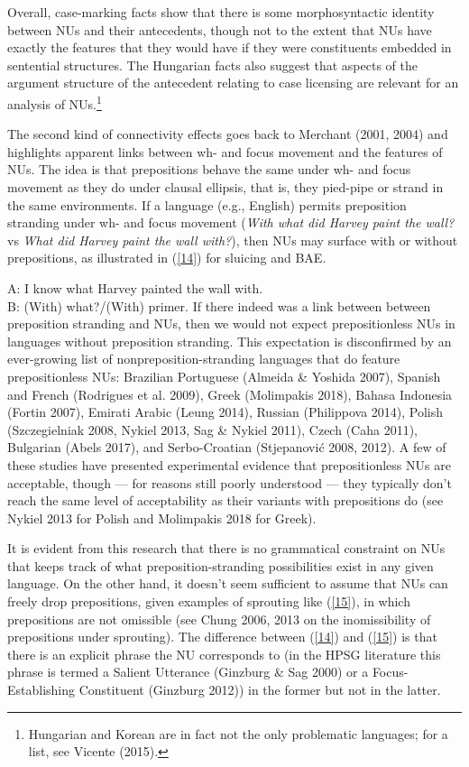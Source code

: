 \documentclass[output=paper]{langsci/langscibook}
\begin{document}
{Overall, case-marking facts show that there is some morphosyntactic identity between NUs and their antecedents, though not to the extent that NUs have exactly the features that they would have if they were constituents embedded in sentential structures. The Hungarian facts also suggest that aspects of the argument structure of the antecedent relating to case licensing are relevant for an analysis of NUs.\footnote{Hungarian and Korean are in fact not the only problematic languages; for a list, see Vicente (2015).}

The second kind of connectivity effects goes back to Merchant (2001, 2004) and highlights apparent links between wh- and focus movement and the features of NUs. The idea is that prepositions behave the same under wh- and focus movement as they do under clausal ellipsis, that is, they pied-pipe or strand in the same environments. If a language (e.g., English) permits preposition stranding under wh- and focus movement ({\it With what did Harvey paint the wall?} vs {\it What did Harvey paint the wall with?}), then NUs may surface with or without prepositions, as illustrated in (\ref{14}) for sluicing and BAE.

\ea A: I know what Harvey painted the wall with.\\B: (With) what?/(With) primer.\label{14}\z
If there indeed was a link between between preposition stranding and NUs, then we would not expect prepositionless NUs in languages without preposition stranding. This expectation is disconfirmed by an ever-growing list of nonpreposition-stranding languages that do feature prepositionless NUs: Brazilian Portuguese (Almeida \& Yoshida 2007), Spanish and French (Rodrigues et al. 2009), Greek (Molimpakis 2018), Bahasa Indonesia (Fortin 2007), Emirati Arabic (Leung 2014), Russian (Philippova 2014), Polish (Szczegielniak 2008, Nykiel 2013, Sag \& Nykiel 2011), Czech (Caha 2011), Bulgarian (Abels 2017), and Serbo-Croatian (Stjepanovi\'{c} 2008, 2012). A few of these studies have presented experimental evidence that prepositionless NUs are acceptable, though --- for reasons still poorly understood --- they typically don't reach the same level of acceptability as their variants with prepositions do (see Nykiel 2013 for Polish and Molimpakis 2018 for Greek).

 It is evident from this research that there is no grammatical constraint on NUs that keeps track of what preposition-stranding possibilities exist in any given language. On the other hand, it doesn't seem sufficient to assume that NUs can freely drop prepositions, given examples of sprouting like (\ref{15}), in which prepositions are not omissible (see Chung 2006, 2013 on the inomissibility of prepositions under sprouting). The difference between (\ref{14}) and (\ref{15}) is that there is an explicit phrase the NU corresponds to (in the HPSG literature this phrase is termed a Salient Utterance (Ginzburg \& Sag 2000) or a Focus-Establishing Constituent (Ginzburg 2012)) in the former but not in the latter.

}
\end{document}
